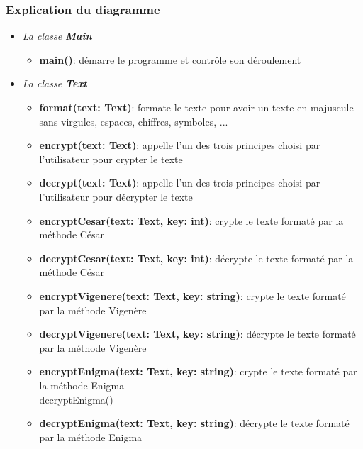 \documentclass[a4paper,12pt,abstracton,titlepage]{scrartcl}
\begin{document}
\subsubsection{Explication du diagramme}
\vspace{0.3cm}
\begin{itemize}
\item \textit{La classe \textbf{Main}}\vspace{0.3cm}
\begin{itemize}
\item \textbf{main()}:
démarre le programme et contrôle son déroulement\\
\end{itemize}\vspace{0.4cm}
\item \textit{La classe \textbf{Text}}
\vspace{0.3cm}
\begin{itemize}
\item \textbf{format(text: Text)}:
formate le texte pour avoir un texte en majuscule sans virgules, espaces, chiffres, symboles, ...\\
\item \textbf{encrypt(text: Text)}:
appelle l’un des trois principes choisi par l’utilisateur pour crypter le texte\\
\item \textbf{decrypt(text: Text)}:
appelle l’un des trois principes choisi par l’utilisateur pour décrypter le texte\\
\item \textbf{encryptCesar(text: Text, key: int)}:
crypte le texte formaté par la méthode César\\
\item \textbf{decryptCesar(text: Text, key: int)}:
décrypte le texte formaté par la méthode César\\
\item \textbf{encryptVigenere(text: Text, key: string)}:
crypte le texte formaté par la méthode Vigenère\\
\item \textbf{decryptVigenere(text: Text, key: string)}:
décrypte le texte formaté par la méthode Vigenère\\
\item \textbf{encryptEnigma(text: Text, key: string)}:
crypte le texte formaté par la méthode Enigma\\
decryptEnigma() 
\item \textbf{decryptEnigma(text: Text, key: string)}:
décrypte le texte formaté par la méthode Enigma\\

\end{itemize}
\end{itemize}
\end{document}
